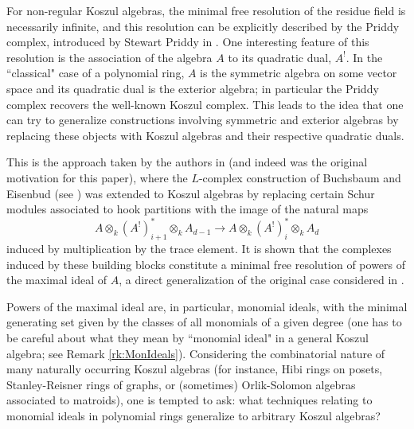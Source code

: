 \documentclass[10pt]{amsart}
\theoremstyle{definition}
\theoremstyle{remark}
\newtheorem{the context}[theorem]{The Context}
\numberwithin{equation}{theorem}
\numberwithin{equation}{section}
\begin{document}
For non-regular Koszul algebras, the minimal free resolution of the residue field is necessarily infinite, and this resolution can be explicitly described by the Priddy complex, introduced by Stewart Priddy in \cite{priddy1970koszul}. One interesting feature of this resolution is the association of the algebra $A$ to its quadratic dual, $A^!$. In the ``classical" case of a polynomial ring, $A$ is the symmetric algebra on some vector space and its quadratic dual is the exterior algebra; in particular the Priddy complex recovers the well-known Koszul complex. This leads to the idea that one can try to generalize constructions involving symmetric and exterior algebras by replacing these objects with Koszul algebras and their respective quadratic duals.

This is the approach taken by the authors in \cite{faber2020canonical} (and indeed was the original motivation for this paper), where the $L$-complex construction of Buchsbaum and Eisenbud (see \cite{buchsbaum1975generic}) was extended to Koszul algebras by replacing certain Schur modules associated to hook partitions with the image of the natural maps
$$A \otimes_k (A^!)^*_{i+1} \otimes_k A_{d-1}  \to A \otimes_k (A^!)^*_i \otimes_k A_d$$
induced by multiplication by the trace element. It is shown that the complexes induced by these building blocks constitute a minimal free resolution of powers of the maximal ideal of $A$, a direct generalization of the original case considered in \cite{buchsbaum1975generic}.

Powers of the maximal ideal are, in particular, monomial ideals, with the minimal generating set given by the classes of all monomials of a given degree (one has to be careful about what they mean by ``monomial ideal" in a general Koszul algebra; see Remark \ref{rk:MonIdeals}). Considering the combinatorial nature of many naturally occurring Koszul algebras (for instance, Hibi rings on posets, Stanley-Reisner rings of graphs, or (sometimes) Orlik-Solomon algebras associated to matroids), one is tempted to ask: what techniques relating to monomial ideals in polynomial rings generalize to arbitrary Koszul algebras?
\end{document}

